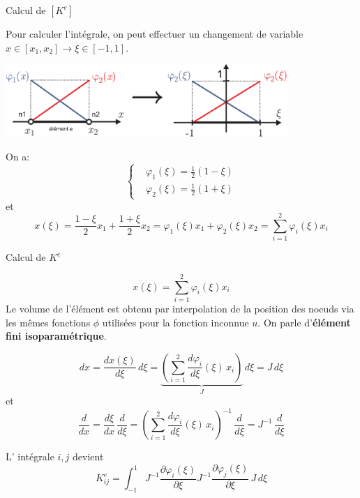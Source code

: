 \documentclass[
mode=present,    %
paper=a4paper,   %
orient=landscape,
display=slides,   %
size=10pt,     %
style=romain   %
]{powerdot}
\begin{document}
\begin{slide}[toc=]{Calcul de $[K^e]$}

Pour calculer l'intégrale, on peut effectuer un changement de variable $x\in[x_1,x_2] \rightarrow \xi\in[-1,1]$.
    \centerline{\includegraphics[width=0.8\textwidth]{Ke3.eps} }
On a:
\begin{equation*}
    \left\{
        \begin{aligned}
            &\varphi_1(\xi) = \frac{1}{2} (1-\xi) \\
            &\varphi_2(\xi) = \frac{1}{2} (1+\xi)
        \end{aligned}
    \right.
\end{equation*}
et
\begin{equation*}
    x(\xi) = \frac{1-\xi}{2} x_1 + \frac{1+\xi}{2} x_2
    = \varphi_1(\xi) x_1 +  \varphi_2(\xi) x_2
    = \sum_{i=1}^2 \varphi_i(\xi) x_i
\end{equation*}

\end{slide}


\begin{slide}[toc=]{Calcul de $K^e$}

\begin{equation*}
    x(\xi) = \sum_{i=1}^2 \varphi_i(\xi) x_i
\end{equation*}
Le volume de l'élément est obtenu par interpolation de la position des noeuds via les mêmes fonctions $\phi$ utilisées pour la fonction inconnue $u$. On parle d'\textbf{élément fini isoparamétrique}.

\begin{equation*}
    dx = \frac{d x(\xi)}{d\xi} \, d\xi = \underbrace{\left(\sum_{i=1}^2 \frac{d \varphi_i}{d\xi}(\xi)\, x_i \right)}_{J} \, d\xi = J \, d\xi
\end{equation*}
et
\begin{equation*}
    \frac{d}{dx}
    = \frac{d\xi}{dx} \, \frac{d}{d\xi}
    = \left(\sum_{i=1}^2 \frac{d \varphi_i}{d\xi}(\xi)\, x_i \right)^{-1} \, \frac{d}{d\xi} = J^{-1}  \, \frac{d}{d\xi}
\end{equation*}

L' intégrale $i,j$ devient
\begin{equation*}
    K^e_{ij} = \int_{-1}^{1} J^{-1}\frac{\partial\varphi_i(\xi)}{\partial \xi}
    J^{-1}\frac{\partial\varphi_j(\xi)}{\partial \xi}  \,J\, d\xi
\end{equation*}

\end{slide}
\end{document}
